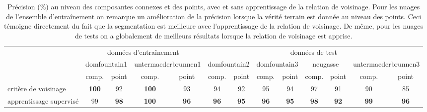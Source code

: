 \begin{table}[]
\tiny
\begin{tabular}{l|c|c|c|c|c|c|c|c|c|c|c|c|}
\cline{2-13}
                                              & \multicolumn{4}{c|}{données d'entraînement}                                  & \multicolumn{8}{c|}{données de test}                                                                                                             \\ \cline{2-13} 
                                              & \multicolumn{2}{c|}{domfountain1} & \multicolumn{2}{c|}{untermaederbrunnen1} & \multicolumn{2}{c|}{domfountain2} & \multicolumn{2}{c|}{domfountain3} & \multicolumn{2}{c|}{neugasse} & \multicolumn{2}{c|}{untermaederbrunnen3} \\ \cline{2-13} 
                                              & comp.            & point          & comp.               & point              & comp.           & point           & comp.           & point           & comp.         & point         & comp.               & point              \\ \hline
\multicolumn{1}{|l|}{critère de voisinage}    & \textbf{100}     & 92             & \textbf{100}        & 93                 & 94              & 92              & 95              & 94              & 97            & 91            & 90                  & 85                 \\ \hline
\multicolumn{1}{|l|}{apprentissage supervisé} & 99               & \textbf{98}    & \textbf{100}        & \textbf{96}        & \textbf{96}     & \textbf{95}     & \textbf{96}     & \textbf{95}     & \textbf{98}   & \textbf{92}   & \textbf{99}         & \textbf{96}        \\ \hline
\end{tabular}
\caption{Précision (\%) au niveau des composantes connexes et des points, avec et sans apprentissage de la relation de voisinage. Pour les nuages de l'ensemble d'entraînement on remarque un amélioration de la précision lorsque la vérité terrain est donnée au niveau des points. Ceci témoigne directement du fait que la segmentation est meilleure avec l'apprentissage de la relation de voisinage. De même, pour les nuages de tests on a globalement de meilleurs résultats lorsque la relation de voisinage est apprise.}
\label{table:neighbourhood}
\end{table}